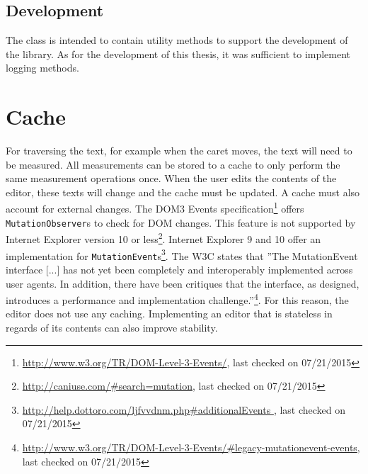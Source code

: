 \subsection{Development}

The  class is intended to contain utility methods to support the development of the library. As for the development of this thesis, it was sufficient to implement logging methods.


\section{Cache}
\label{sec:cache}

For traversing the text, for example when the caret moves, the text will need to be measured. All measurements can be stored to a cache to only perform the same measurement operations once. When the user edits the contents of the editor, these texts will change and the cache must be updated. A cache must also account for external changes. The DOM3 Events specification\footnote{\url{http://www.w3.org/TR/DOM-Level-3-Events/}, last checked on 07/21/2015} offers \texttt{MutationObserver}s to check for DOM changes. This feature is not supported by Internet Explorer version 10 or less\footnote{\url{http://caniuse.com/\#search=mutation}, last checked on 07/21/2015}. Internet Explorer 9 and 10 offer an implementation for \texttt{MutationEvent}s\footnote{\url{http://help.dottoro.com/ljfvvdnm.php\#additionalEvents }, last checked on 07/21/2015}. The W3C states that ''The MutationEvent interface [...] has not yet been completely and interoperably implemented across user agents. In addition, there have been critiques that the interface, as designed, introduces a performance and implementation challenge.''\footnote{\url{http://www.w3.org/TR/DOM-Level-3-Events/\#legacy-mutationevent-events}, last checked on 07/21/2015}. For this reason, the editor does not use any caching. Implementing an editor that is stateless in regards of its contents can also improve stability.




